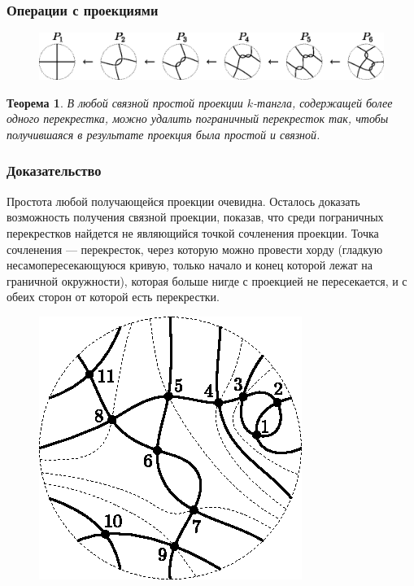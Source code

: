 \documentclass[dvips, intlimits, 9pt, unicode, notheorems]{beamer}
\theoremstyle{plain}
\newtheorem{theorem}{Теорема}
\theoremstyle{definition}
\begin{document}
	\begin{frame}
		\frametitle{Операции с проекциями}

		\begin{figure}[ht]
			\centering
			\includegraphics[scale = 0.7]{c/geneology.eps}
		\end{figure}

		\begin{theorem}
			В любой связной простой проекции $k$-тангла, содержащей более одного перекрестка, можно удалить пограничный
			перекресток так, чтобы получившаяся в результате проекция была простой и связной.
		\end{theorem}
	\end{frame}

	\begin{frame}
		\frametitle{Доказательство}

		Простота любой получающейся проекции очевидна. Осталось доказать возможность получения связной проекции, показав,
		что среди пограничных перекрестков найдется не являющийся точкой сочленения проекции. Точка сочленения --- перекресток,
		через которую можно провести хорду (гладкую несамопересекающуюся кривую, только начало и конец которой лежат на граничной
		окружности), которая больше нигде с проекцией не пересекается, и с обеих сторон от которой есть перекрестки.
		\begin{figure}[H]
			\centering
			\includegraphics[scale = 1]{c/cutpoints-proof.eps}
		\end{figure}
	\end{frame}
\end{document}

